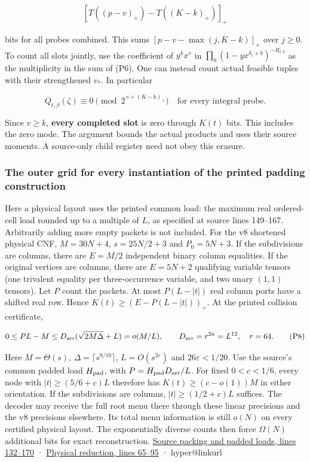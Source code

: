 \documentclass[11pt,a4paper]{article}
\makeatletter
\newcommand{\PaperSixCatalogue}[1]{\csname hyper@linkurl\endcsname{#1}{EVIDENCE_CATALOG.md}}
\newcommand{\PaperSixEvidence}[2]{\PaperSixCatalogue{#2}}
\makeatother
\begin{document}
\[
 \left[T((p-v)_+)-T((K-k)_+)\right]_+
 \tag{P6}
\]

bits for all probes combined. This sums \([p-v-\max(j,K-k)]_+\) over
\(j\ge0\). To count all slots jointly, use the coefficient of
\(y^k x^v\) in \(\prod_b(1-yx^{\delta_i+b})^{-R_{t,b}}\) as the
multiplicity in the sum of (P6). One can instead count actual feasible
tuples with their strengthened \(v_*\). In particular

\[
 Q_{t,\beta}(\zeta)\equiv0\pmod{2^{\,v+(K-k)_+}}
 \quad\text{for every integral probe}.
 \tag{P7}
\]

Since \(v\ge k\), \textbf{every completed slot} is zero through \(K(t)\)
bits. This includes the zero mode. The argument bounds the actual
products and uses their source moments. A source-only child register
need not obey this erasure.

\subsubsection{The outer grid for every instantiation of the printed
padding
construction}\label{v9-the-outer-grid-for-every-instantiation-of-the-printed-padding-construction}

Here a physical layout uses the printed common load: the maximum real
ordered-cell load rounded up to a multiple of \(L\), as specified at
source lines 149--167. Arbitrarily adding more empty packets is not
included. For the v8 shortened physical CNF, \(M=30N+4\), \(s=25N/2+3\)
and \(P_0=5N+3\). If the subdivisions are columns, there are \(E=M/2\)
independent binary column equalities. If the original vertices are
columns, there are \(E=5N+2\) qualifying variable tensors (one trivalent
equality per three-occurrence variable, and two unary \((1,1)\)
tensors). Let \(P\) count the packets. At most \(P(L-|t|)\) real column
ports have a shifted real row. Hence \(K(t)\ge(E-P(L-|t|))_+\). At the
printed collision certificate,

\[
 0\le P L-M\le D_{\rm arr}(\sqrt{2M\Delta}+L)=o(M/L),
 \qquad D_{\rm arr}=r^{2a}=L^{12},\quad r=64 .
 \tag{P8}
\]

Here \(M=\Theta(s)\), \(\Delta=\lceil s^{9/10}\rceil\),
\(L=O(s^{2\varepsilon})\) and \(26\varepsilon<1/20\). Use the source's
common padded load \(H_{\rm pad}\), with \(P=H_{\rm pad}D_{\rm arr}/L\).
For fixed \(0<c<1/6\), every node with \(|t|\ge(5/6+c)L\) therefore has
\(K(t)\ge(c-o(1))M\) in either orientation. If the subdivisions are
columns, \(|t|\ge(1/2+c)L\) suffices. The decoder may receive the full
root menu there through these linear precisions and the v8 precisions
elsewhere. Its total menu information is still \(o(N)\) on every
certified physical layout. The exponentially diverse counts then force
\(\Omega(N)\) additional bits for exact reconstruction.
\href{https://github.com/openai/math/blob/main/preprints/The-Exponential-Time-Hypothesis-is-False-October-25-2026/build/quantitative-contraction.tex\#L132}{Source
packing and padded loads, lines 132--170} ·
\href{https://github.com/openai/math/blob/main/preprints/The-Exponential-Time-Hypothesis-is-False-October-25-2026/build/quantitative-reduction.tex\#L65}{Physical
reduction, lines 65--95} ·
\PaperSixEvidence{evidence/research_v8/applications/pooled_menu_barrier.md}{Physical
family and counts}
\end{document}
